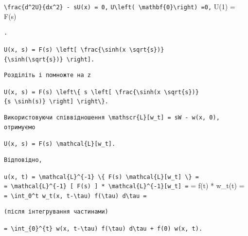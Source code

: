 \documentclass[
  ukrainian,
]{article}
\begin{document}
\texttt{\textbackslash{}frac\{d\^{}2U\}\{dx\^{}2\}\ -\ sU(x)\ =\ 0,}
\texttt{U\textbackslash{}left(\ \textbackslash{}mathbf\{0\}\textbackslash{}right)\ =0,}
U(1) = F(s)

\begin{verbatim}
.
\end{verbatim}

\texttt{U(x,\ s)\ =\ F(s)\ \textbackslash{}left{[}\ \textbackslash{}frac\{\textbackslash{}sinh(x\ \textbackslash{}sqrt\{s\})\}\{\textbackslash{}sinh(\textbackslash{}sqrt\{s\})\}\ \textbackslash{}right{]}.}

\begin{verbatim}
Розділіть і помножте на z
\end{verbatim}

\texttt{U(x,\ s)\ =\ F(s)\ \textbackslash{}left\textbackslash{}\{\ s\ \textbackslash{}left{[}\ \textbackslash{}frac\{\textbackslash{}sinh(x\ \textbackslash{}sqrt\{s\})\}\{s\ \textbackslash{}sinh(s)\}\ \textbackslash{}right{]}\ \textbackslash{}right\textbackslash{}\}.}

\begin{verbatim}
Використовуючи співвідношення \mathscr{L}[w_t] = sW - w(x, 0), отримуємо
\end{verbatim}

\texttt{U(x,\ s)\ =\ F(s)\ \textbackslash{}mathcal\{L\}{[}w\_t{]}.}

\begin{verbatim}
Відповідно,
\end{verbatim}

\texttt{u(x,\ t)\ =\ \textbackslash{}mathcal\{L\}\^{}\{-1\}\ \textbackslash{}\{\ F(s)\ \textbackslash{}mathcal\{L\}{[}w\_t{]}\ \textbackslash{}\}\ =}
\texttt{=\ \textbackslash{}mathcal\{L\}\^{}\{-1\}\ {[}\ F(s)\ {]}\ *\ \textbackslash{}mathcal\{L\}\^{}\{-1\}{[}w\_t{]}\ =}
= f(t) * w\_t(t) =
\texttt{=\ \textbackslash{}int\_0\^{}t\ w\_t(x,\ t-\textbackslash{}tau)\ f(\textbackslash{}tau)\ d\textbackslash{}tau\ =}

\begin{verbatim}
(після інтегрування частинами)
\end{verbatim}

\texttt{=\ \textbackslash{}int\_\{0\}\^{}\{t\}\ w(x,\ t-\textbackslash{}tau)\ f\textquotesingle{}(\textbackslash{}tau)\ d\textbackslash{}tau\ +\ f(0)\ w(x,\ t).}
\end{document}

